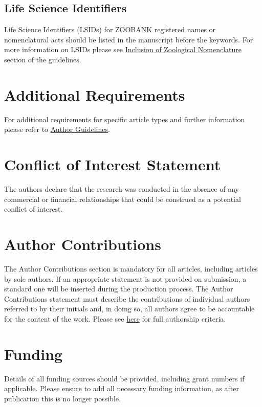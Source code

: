 \documentclass[utf8]{frontiersSCNS} %
\begin{document}
\subsection{Life Science Identifiers}
Life Science Identifiers (LSIDs) for ZOOBANK registered names or nomenclatural acts should be listed in the manuscript before the keywords. For more information on LSIDs please see \href{http://www.frontiersin.org/about/AuthorGuidelines#InclusionofZoologicalNomenclature}{Inclusion of Zoological Nomenclature} section of the guidelines.


\section{Additional Requirements}

For additional requirements for specific article types and further information please refer to \href{http://www.frontiersin.org/about/AuthorGuidelines#AdditionalRequirements}{Author Guidelines}.

\section*{Conflict of Interest Statement}

The authors declare that the research was conducted in the absence of any commercial or financial relationships that could be construed as a potential conflict of interest.

\section*{Author Contributions}

The Author Contributions section is mandatory for all articles, including articles by sole authors. If an appropriate statement is not provided on submission, a standard one will be inserted during the production process. The Author Contributions statement must describe the contributions of individual authors referred to by their initials and, in doing so, all authors agree to be accountable for the content of the work. Please see  \href{http://home.frontiersin.org/about/author-guidelines#AuthorandContributors}{here} for full authorship criteria.

\section*{Funding}
Details of all funding sources should be provided, including grant numbers if applicable. Please ensure to add all necessary funding information, as after publication this is no longer possible.
\end{document}
